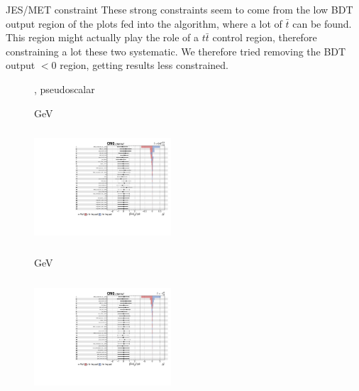 \documentclass[8pt]{beamer}
\begin{document}
\begin{frame}{JES/MET constraint}
\justifying
These strong constraints seem to come from the low BDT output region of the plots fed into the algorithm, where a lot of $ \bar t$ can be found. This region might actually play the role of a $t \bar t$ control region, therefore constraining a lot these two systematic. \vfill
We therefore tried removing the BDT output $< 0$ region, getting results less constrained. \vfill

\begin{figure}[htbp]
\centering
\begin{block}{, pseudoscalar}\end{block}	\vspace{-8pt}

\begin{minipage}[b]{0.49\textwidth}
\begin{center}
\centering \begin{block}{ GeV}\end{block}	
\includegraphics[width=5.1cm, height=4.2cm]{figs/impacts_fixed/impacts_2018_both_pseudo_100.pdf}
\end{center}
\end{minipage}\hfill
\begin{minipage}[b]{0.49\textwidth}
\begin{center}
\centering \begin{block}{ GeV}\end{block}	
\includegraphics[width=5.1cm, height=4.2cm]{figs/impacts_fixed/impacts_2018_both_pseudo_500.pdf}
\end{center}
\end{minipage} \hfill
\end{figure} \vfill
\end{frame}
\end{document}
